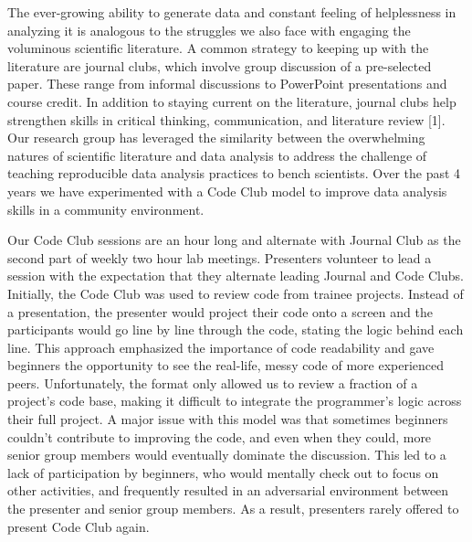 \documentclass[
  11pt,
]{article}
\begin{document}
The ever-growing ability to generate data and constant feeling of
helplessness in analyzing it is analogous to the struggles we also face
with engaging the voluminous scientific literature. A common strategy to
keeping up with the literature are journal clubs, which involve group
discussion of a pre-selected paper. These range from informal
discussions to PowerPoint presentations and course credit. In addition
to staying current on the literature, journal clubs help strengthen
skills in critical thinking, communication, and literature review
{[}1{]}. Our research group has leveraged the similarity between the
overwhelming natures of scientific literature and data analysis to
address the challenge of teaching reproducible data analysis practices
to bench scientists. Over the past 4 years we have experimented with a
Code Club model to improve data analysis skills in a community
environment.

Our Code Club sessions are an hour long and alternate with Journal Club
as the second part of weekly two hour lab meetings. Presenters volunteer
to lead a session with the expectation that they alternate leading
Journal and Code Clubs. Initially, the Code Club was used to review code
from trainee projects. Instead of a presentation, the presenter would
project their code onto a screen and the participants would go line by
line through the code, stating the logic behind each line. This approach
emphasized the importance of code readability and gave beginners the
opportunity to see the real-life, messy code of more experienced peers.
Unfortunately, the format only allowed us to review a fraction of a
project's code base, making it difficult to integrate the programmer's
logic across their full project. A major issue with this model was that
sometimes beginners couldn't contribute to improving the code, and even
when they could, more senior group members would eventually dominate the
discussion. This led to a lack of participation by beginners, who would
mentally check out to focus on other activities, and frequently resulted
in an adversarial environment between the presenter and senior group
members. As a result, presenters rarely offered to present Code Club
again.
\end{document}
